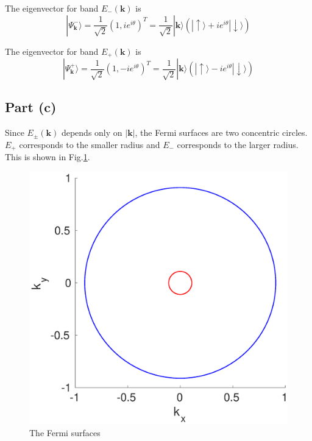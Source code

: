 \documentclass{article}
\begin{document}
The eigenvector for band $E_-(\mathbf{k})$ is
\begin{equation*}
|\Psi^-_{\mathbf{k}}\rangle=\frac{1}{\sqrt{2}}(1,ie^{i\theta})^T=\frac{1}{\sqrt{2}}|\mathbf{k}\rangle(|\uparrow\rangle+ie^{i\theta}|\downarrow\rangle)
\end{equation*}

The eigenvector for band $E_+(\mathbf{k})$ is
\begin{equation*}
|\Psi^+_{\mathbf{k}}\rangle=\frac{1}{\sqrt{2}}(1,-ie^{i\theta})^T=\frac{1}{\sqrt{2}}|\mathbf{k}\rangle(|\uparrow\rangle-ie^{i\theta}|\downarrow\rangle)
\end{equation*}

\subsection{Part (c)}
Since $E_{\pm}(\mathbf{k})$ depends only on $|\mathbf{k}|$, the Fermi surfaces are two concentric circles. $E_+$ corresponds to the smaller radius and $E_-$ corresponds to the larger radius. This is shown in Fig.\ref{Fermi}.
\begin{figure}[!htbp]
	\centering
	\includegraphics[width=12cm]{Fermi.eps}
	\caption{The Fermi surfaces}\label{Fermi}
\end{figure}
\end{document}
